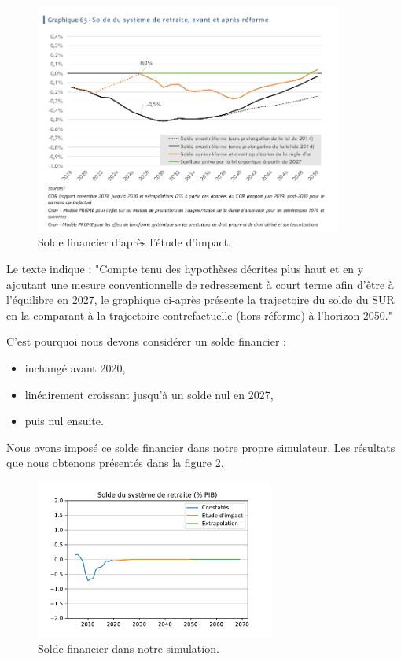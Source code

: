 \documentclass[10pt]{article}
\begin{document}
\begin{figure}
\begin{center}
\includegraphics[width=0.9\textwidth]{EtudeImpact-situation-financiere.png}
\end{center}
\caption{Solde financier d'après l'étude d'impact.}
\label{fig-solde-etude-impact}
\end{figure}

Le texte indique : "Compte tenu des hypothèses décrites plus haut 
et en y ajoutant une mesure conventionnelle de redressement à court 
terme afin d’être à l’équilibre en 2027, le graphique ci-après présente 
la trajectoire du solde du SUR en la comparant à la trajectoire 
contrefactuelle (hors réforme) à l’horizon 2050."

C'est pourquoi nous devons considérer un solde financier :
\begin{itemize}
\item inchangé avant 2020,
\item linéairement croissant jusqu'à un solde nul en 2027,
\item puis nul ensuite.
\end{itemize}

Nous avons imposé ce solde financier dans notre propre simulateur. 
Les résultats que nous obtenons présentés dans la figure \ref{fig-solde-simulation}. 

\begin{figure}
\begin{center}
\includegraphics[width=0.7\textwidth]{Simulation-Solde-Financier.pdf}
\end{center}
\caption{Solde financier dans notre simulation.}
\label{fig-solde-simulation}
\end{figure}
\end{document}
